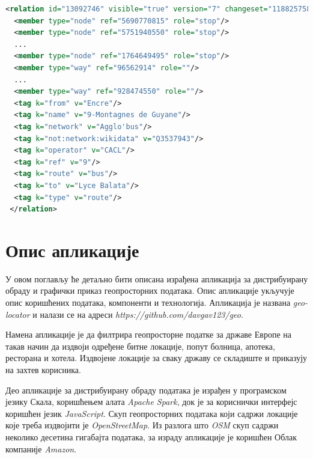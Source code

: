 \documentclass[12pt,oneside]{memoir}
\begin{document}
\begin{lstlisting}[language=XML, caption={\textit{XML} запис \textit{OSM} релације која представља аутобуску линију}, label={lst:osm_relation_xml}]
<relation id="13092746" visible="true" version="7" changeset="118825758" timestamp="2022-03-23T15:05:48Z" user="" uid="">
  <member type="node" ref="5690770815" role="stop"/>
  <member type="node" ref="5751940550" role="stop"/>
  ...
  <member type="node" ref="1764649495" role="stop"/>
  <member type="way" ref="96562914" role=""/>
  ...
  <member type="way" ref="928474550" role=""/>
  <tag k="from" v="Encre"/>
  <tag k="name" v="9-Montagnes de Guyane"/>
  <tag k="network" v="Agglo'bus"/>
  <tag k="not:network:wikidata" v="Q3537943"/>
  <tag k="operator" v="CACL"/>
  <tag k="ref" v="9"/>
  <tag k="route" v="bus"/>
  <tag k="to" v="Lyce Balata"/>
  <tag k="type" v="route"/>
 </relation>
\end{lstlisting}


\chapter{Опис апликације}
\label{chp:app}

У овом поглављу ће детаљно бити описана израђена апликација за дистрибуирану обраду и графички приказ геопросторних података. Опис апликације укључује опис коришћених података, компоненти и технологија. Апликација је названа \textit{geo-locator} и налази се на адреси \textit{https://github.com/davgav123/geo}.

Намена апликације је да филтрира геопросторне податке за државе Европе на такав начин да издвоји одређене битне локације, попут болница, апотека, ресторана и хотела. Издвојене локације за сваку државу се складиште и приказују на захтев корисника. 

Део апликације за дистрибуирану обраду података је израђен у програмском језику Скала, коришћењем алата \textit{Apache Spark}, док је за кориснички интерфејс коришћен језик \textit{JavaScript}. Скуп геопросторних података који садржи локације које треба издвојити је \textit{OpenStreetMap}. Из разлога што \textit{OSM} скуп садржи неколико десетина гигабајта података, за израду апликације је коришћен Облак компаније \textit{Amazon}.
\end{document}
